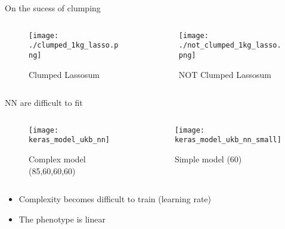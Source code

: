 \documentclass{beamer}
\begin{document}
\begin{frame}[t]{On the sucess of clumping}
  \begin{columns}
    \begin{column}{0.5\textwidth}
      \begin{figure}[htpb]
        \centering
        \texttt{[image: ./clumped\_1kg\_lasso.png]}
        \caption{Clumped Lassosum}
      \end{figure}
    \end{column}
    \begin{column}{0.5\textwidth}
      \begin{figure}[htpb]
        \centering
        \texttt{[image: ./not\_clumped\_1kg\_lasso.png]}
        \caption{NOT Clumped Lassosum}
      \end{figure}
    \end{column}
  \end{columns}
\end{frame}

\begin{frame}[t]{NN are difficult to fit}
  \begin{columns}
    \begin{column}{0.5\textwidth}
      \begin{figure}[htpb]
        \centering
        \texttt{[image: keras\_model\_ukb\_nn]}
        \caption{Complex model (85,60,60,60)}
      \end{figure}
    \end{column}
    \begin{column}{0.5\textwidth}
      \begin{figure}[htpb]
        \centering
        \texttt{[image: keras\_model\_ukb\_nn\_small]}
        \caption{Simple model (60)}
      \end{figure}
    \end{column}
  \end{columns}
  \begin{itemize}
    \item Complexity becomes difficult to train (learning rate)
    \item The phenotype is linear
  \end{itemize}
\end{frame}
\end{document}
